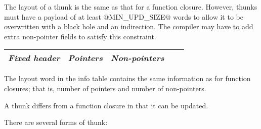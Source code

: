 \documentclass[11pt]{article}
\begin{document}
The layout of a thunk is the same as that for a function closure.
However, thunks must have a payload of at least @MIN_UPD_SIZE@
words to allow it to be overwritten with a black hole and an
indirection.  The compiler may have to add extra non-pointer fields to
satisfy this constraint.

\begin{center}
\begin{tabular}{|l|l|l|l|l|}\hline
\emph{Fixed header}  & \emph{Pointers} & \emph{Non-pointers} \\ \hline
\end{tabular}
\end{center}

The layout word in the info table contains the same information as for
function closures; that is, number of pointers and number of
non-pointers.

A thunk differs from a function closure in that it can be updated.

There are several forms of thunk:
\end{document}
